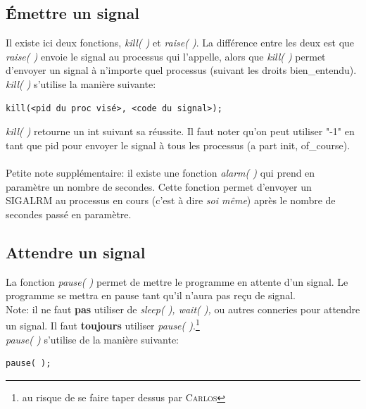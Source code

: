 \documentclass{report}
\begin{document}
\subsection{Émettre un signal}
Il existe ici deux fonctions, \emph{kill( )} et \emph{raise( )}. La différence entre les deux est que \emph{raise( )} envoie le signal au processus qui l'appelle, alors que \emph{kill( )} permet d'envoyer un signal à n'importe quel processus (suivant les droits bien\_entendu).\\
\emph{kill( )} s'utilise la manière suivante:
\begin{lstlisting}
kill(<pid du proc visé>, <code du signal>);
\end{lstlisting}
\emph{kill( )} retourne un int suivant sa réussite. Il faut noter qu'on peut utiliser "-1" en tant que pid pour envoyer le signal à tous les processus (a part init, of\_course).
\paragraph{}
Petite note supplémentaire: il existe une fonction \emph{alarm( )} qui prend en paramètre un nombre de secondes. Cette fonction permet d'envoyer un SIGALRM au processus en cours (c'est à dire \emph{soi même}) après le nombre de secondes passé en paramètre.

\subsection{Attendre un signal}
La fonction \emph{pause( )} permet de mettre le programme en attente d'un signal. Le programme se mettra en pause tant qu'il n'aura pas reçu de signal.\\
Note: il ne faut \textbf{pas} utiliser de \emph{sleep( ), wait( ),} ou autres conneries pour attendre un signal. Il faut \textbf{toujours} utiliser \emph{pause( )}.\footnote{au risque de se faire taper dessus par \textsc{Carlos}}\\
\emph{pause( )} s'utilise de la manière suivante:
\begin{verbatim}
pause( );
\end{verbatim}
\end{document}
